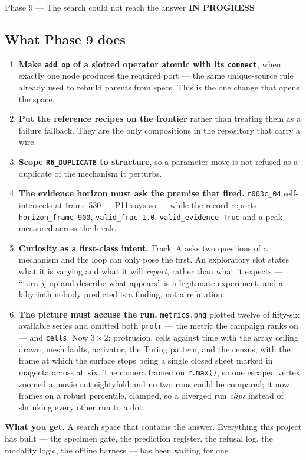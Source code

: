 \documentclass[11pt,a4paper]{article}
\newcommand{\code}[1]{\texttt{#1}}
\newcommand{\prog}{\textcolor{warn}{\textbf{IN PROGRESS}}}
\begin{document}
\begin{phasebox}{Phase 9 --- The search could not reach the answer \hfill \prog}
\subsection*{What Phase 9 does}
\begin{enumerate}\itemsep2pt
\item \textbf{Make \code{add\_op} of a slotted operator atomic with its \code{connect}}, when
      exactly one node produces the required port --- the same unique-source rule already used to
      rebuild parents from specs. This is the one change that opens the space.
\item \textbf{Put the reference recipes on the frontier} rather than treating them as a failure
      fallback. They are the only compositions in the repository that carry a wire.
\item \textbf{Scope \code{R6\_DUPLICATE} to structure}, so a parameter move is not refused as a
      duplicate of the mechanism it perturbs.
\item \textbf{The evidence horizon must ask the premise that fired.} \code{r003c\_04} self-intersects
      at frame 530 --- P11 says so --- while the record reports \code{horizon\_frame 900},
      \code{valid\_frac 1.0}, \code{valid\_evidence True} and a peak measured across the break.
\item \textbf{Curiosity as a first-class intent.} Track~A asks two questions of a mechanism and the
      loop can only pose the first. An exploratory slot states what it is varying and what it will
      \emph{report}, rather than what it expects --- ``turn $\chi$ up and describe what appears''
      is a legitimate experiment, and a labyrinth nobody predicted is a finding, not a refutation.
\item \textbf{The picture must accuse the run.} \code{metrics.png} plotted twelve of fifty-six
      available series and omitted both \code{protr} --- the metric the campaign ranks on --- and
      \code{cells}. Now $3\times2$: protrusion, cells against time with the array ceiling drawn,
      mesh faults, activator, the Turing pattern, and the census; with the frame at which the
      surface stops being a single closed sheet marked in magenta across all six. The camera framed
      on \code{r.max()}, so one escaped vertex zoomed a movie out eightyfold and no two runs could
      be compared; it now frames on a robust percentile, clamped, so a diverged run \emph{clips}
      instead of shrinking every other run to a dot.
\end{enumerate}

\textbf{What you get.} A search space that contains the answer. Everything this project has built
--- the specimen gate, the prediction register, the refusal log, the modality logic, the offline
harness --- has been waiting for one.
\end{phasebox}
\end{document}
